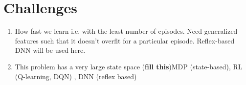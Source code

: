 \documentclass[12pt]{article}
\begin{document}
\section{Challenges}
\begin{enumerate}[label=(\alph*)]
\item How fast we learn i.e. with the least number of episodes. Need generalized features such that it doesn’t overfit for a particular episode. Reflex-based DNN will be used here.
\item This problem has a very large state space (\textbf{fill this})MDP (state-based), RL (Q-learning, DQN) , DNN (reflex based)
\end{enumerate}



\end{document}
